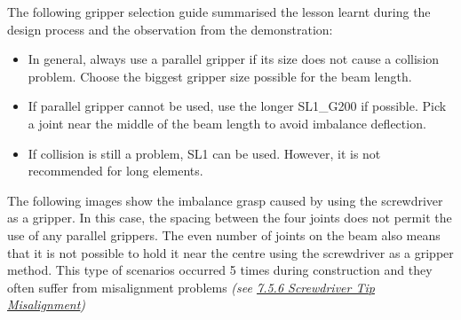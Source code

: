 \documentclass[11pt]{book}
\begin{document}
The following gripper selection guide summarised the lesson learnt during the design process and the observation from the demonstration:

\begin{itemize}
	\item In general, always use a parallel gripper if its size does not cause a collision problem. Choose the biggest gripper size possible for the beam length.

	\item If parallel gripper cannot be used, use the longer SL1\_G200 if possible. Pick a joint near the middle of the beam length to avoid imbalance deflection.

	\item If collision is still a problem, SL1 can be used. However, it is not recommended for long elements.

\end{itemize}
The following images show the imbalance grasp caused by using the screwdriver as a gripper. In this case, the spacing between the four joints does not permit the use of any parallel grippers. The even number of joints on the beam also means that it is not possible to hold it near the centre using the screwdriver as a gripper method. This type of scenarios occurred 5 times during construction and they often suffer from misalignment problems \textit{(see \uline{7.5.6 Screwdriver Tip Misalignment})}
\end{document}
